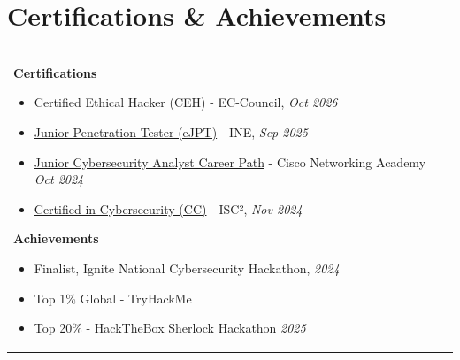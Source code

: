 \documentclass[a4paper,8pt]{article}
\begin{document}
\section{\textbf{Certifications \& Achievements}}
\begin{tabularx}{\linewidth}{ @{}l r@{} }
\begin{minipage}[t]{\linewidth}
\textbf{Certifications}
    \begin{itemize}[nosep,after=\strut, leftmargin=1em, itemsep=2pt]
        \item Certified Ethical Hacker (CEH) - EC-Council, \textit{Oct 2026}    
        \item \href{https://certs.ine.com/a94fd2a6-f00c-460d-ac60-462147fbde23}{Junior Penetration Tester (eJPT)} - INE, \textit{Sep 2025}
        \item \href{https://www.credly.com/badges/0286da72-eb8e-45db-bfad-28cd2af7c71a/public_url}{Junior Cybersecurity Analyst Career Path} - Cisco Networking Academy \textit{Oct 2024}
        \item \href{https://www.credly.com/badges/e31cce24-1238-4274-869e-a73954eae98c/public_url}{Certified in Cybersecurity (CC)} - ISC², \textit{Nov 2024}
    \end{itemize}
\vspace{2pt}
\textbf{Achievements}
    \begin{itemize}[nosep,after=\strut, leftmargin=1em, itemsep=2pt]
        \item Finalist, Ignite National Cybersecurity Hackathon, \textit{2024}
        \item Top 1\% Global - TryHackMe
        \item Top 20\% - HackTheBox Sherlock Hackathon \textit{2025}
    \end{itemize}
\end{minipage}
\end{tabularx}
\end{document}
